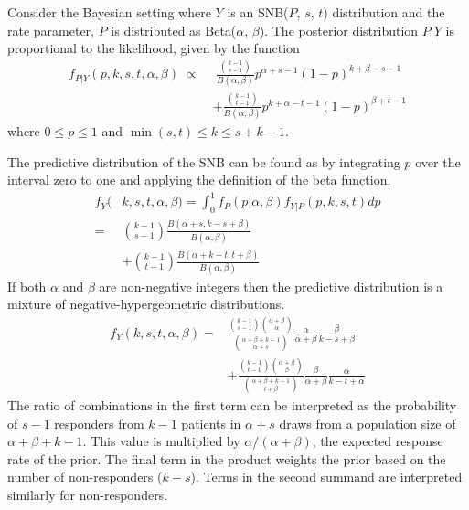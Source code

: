 \documentclass[sii]{ipart}
\begin{document}
Consider the Bayesian setting where $Y$ is an SNB($P$, $s$, $t$) distribution and the rate parameter, $P$ 
is distributed as Beta($\alpha$, $\beta$). The posterior distribution $P|Y$ is proportional to the 
likelihood, given by the function
\begin{align} \label{eqn:ptl}
f_{P|Y}(p, k, s, t, \alpha, \beta) \; \propto \ &
  \ \frac{ {k-1 \choose s-1} }{B(\alpha, \beta)} p^{\alpha +s -1} 
    (1-p)^{k+\beta-s-1} \\
  & + \frac{ {k-1 \choose t-1} }{B(\alpha, \beta)} p^{k+\alpha -t -1} 
    (1-p)^{\beta+t-1} \nonumber
\end{align}
where $0 \leq p \leq 1$ and $\min(s, t) \leq k \leq s+k-1$.

The predictive distribution of the SNB can be found as by integrating
$p$ over the interval zero to one and applying the definition of the 
beta function.
\begin{align} \label{eqn:predictive}
f_{Y}(&k, s, t, \alpha, \beta) = 
  \int_0^1 f_P(p | \alpha, \beta )  f_{Y|P}(p, k, s, t) dp \\ 
  = & {k-1 \choose s-1} \frac{B\left(\alpha+s, k-s+\beta \right)}{B(\alpha, \beta)} 
     \nonumber \\
  & + {k-1 \choose t-1} 
    \frac{B\left(\alpha + k - t, t+\beta\right)}{B(\alpha, \beta)} \nonumber
\end{align}
If both $\alpha$ and $\beta$ are non-negative integers then the predictive
distribution is a mixture of negative-hypergeometric distributions. 
\begin{align*} \label{eqn:hypergeo}
f_{Y}(k, s, t, \alpha, \beta) = & 
  \frac{ {k - 1 \choose s - 1 } 
         {\alpha + \beta \choose \alpha} }{
         {\alpha + \beta + k - 1 \choose \alpha + s}}
  \frac{\alpha}{\alpha + \beta}
  \frac{ \beta }{ k-s+\beta } \\ & +
  \frac{ {k - 1 \choose t - 1} 
         {\alpha + \beta \choose \beta} 
         }{
         {\alpha + \beta + k -1 \choose t + \beta}
       }
  \frac{ \beta }{ \alpha + \beta}
  \frac{ \alpha }{ k-t + \alpha}
\end{align*}
The ratio of combinations in the first term can be interpreted as the
probability of $s-1$ responders from $k-1$ patients in $\alpha + s$ draws
from a population size of $\alpha + \beta + k - 1$. This value is multiplied
by $\alpha / (\alpha + \beta)$, the expected response rate of the prior. 
The final term in the product weights the prior based on the number
of non-responders ($k-s$). Terms in the second summand are interpreted similarly
for non-responders.
\end{document}
